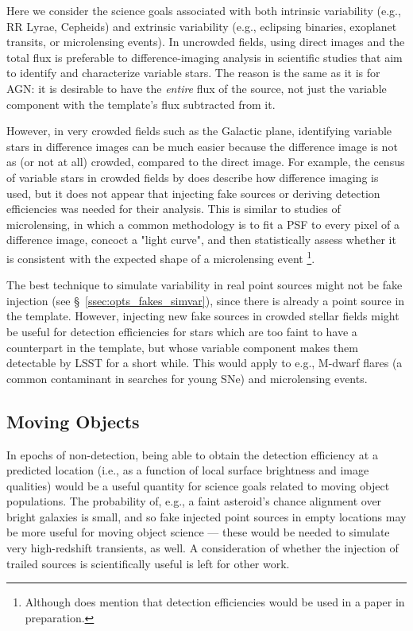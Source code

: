 \documentclass[DM,lsstdraft,toc]{lsstdoc}
\begin{document}
Here we consider the science goals associated with both intrinsic variability (e.g., RR Lyrae, Cepheids) and extrinsic variability (e.g., eclipsing binaries, exoplanet transits, or microlensing events). In uncrowded fields, using direct images and the total flux is preferable to difference-imaging analysis in scientific studies that aim to identify and characterize variable stars. The reason is the same as it is for AGN: it is desirable to have the {\it entire} flux of the source, not just the variable component with the template's flux subtracted from it.

However, in very crowded fields such as the Galactic plane, identifying variable stars in difference images can be much easier because the difference image is not as (or not at all) crowded, compared to the direct image. For example, the census of variable stars in crowded fields by \cite{2016A&A...588A.128F} does describe how difference imaging is used, but it does not appear that injecting fake sources or deriving detection efficiencies was needed for their analysis. This is similar to studies of microlensing, in which a common methodology is to fit a PSF to every pixel of a difference image, concoct a "light curve", and then statistically assess whether it is consistent with the expected shape of a microlensing event \cite{2015ApJ...806..161L}\footnote{Although \cite{2015ApJ...806..161L} does mention that detection efficiencies would be used in a paper in preparation.}.

The best technique to simulate variability in real point sources might not be fake injection (see \S~\ref{ssec:opts_fakes_simvar}), since there is already a point source in the template. However, injecting new fake sources in crowded stellar fields might be useful for detection efficiencies for stars which are too faint to have a counterpart in the template, but whose variable component makes them detectable by LSST for a short while. This would apply to e.g., M-dwarf flares (a common contaminant in searches for young SNe) and microlensing events.


\subsection{Moving Objects}\label{ssec:sci_move}

In epochs of non-detection, being able to obtain the detection efficiency at a predicted location (i.e., as a function of local surface brightness and image qualities) would be a useful quantity for science goals related to moving object populations. The probability of, e.g., a faint asteroid's chance alignment over bright galaxies is small, and so fake injected point sources in empty locations may be more useful for moving object science --- these would be needed to simulate very high-redshift transients, as well. A consideration of whether the injection of trailed sources is scientifically useful is left for other work.
\end{document}
